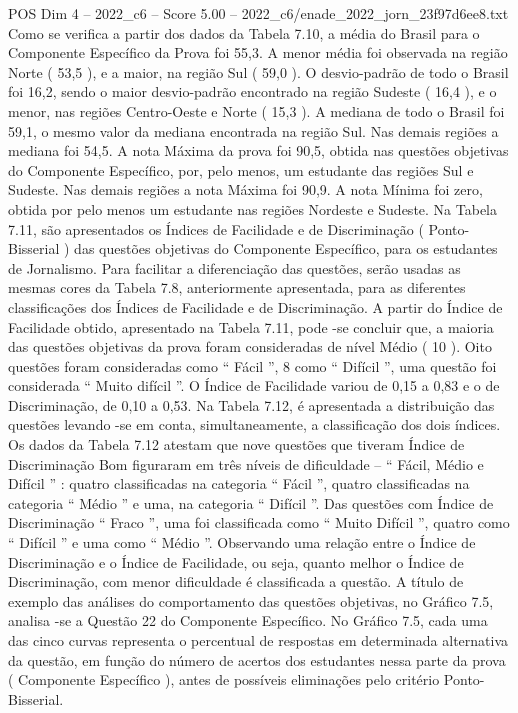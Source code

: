 \begin{textsample}{POS Dim 4 – 2022\_c6 – Score 5.00 – 2022\_c6/enade\_2022\_jorn\_23f97d6ee8.txt}
Como se verifica a partir dos dados da Tabela 7.10, a média do Brasil para o Componente Específico da Prova foi 55,3.
A menor média foi observada na região Norte ( 53,5 ), e a maior, na região Sul ( 59,0 ).
O desvio-padrão de todo o Brasil foi 16,2, sendo o maior desvio-padrão encontrado na região Sudeste ( 16,4 ), e o menor, nas regiões Centro-Oeste e Norte ( 15,3 ).
A mediana de todo o Brasil foi 59,1, o mesmo valor da mediana encontrada na região Sul.
Nas demais regiões a mediana foi 54,5.
A nota Máxima da prova foi 90,5, obtida nas questões objetivas do Componente Específico, por, pelo menos, um estudante das regiões Sul e Sudeste.
Nas demais regiões a nota Máxima foi 90,9.
A nota Mínima foi zero, obtida por pelo menos um estudante nas regiões Nordeste e Sudeste.
Na Tabela 7.11, são apresentados os Índices de Facilidade e de Discriminação ( Ponto-Bisserial ) das questões objetivas do Componente Específico, para os estudantes de Jornalismo.
Para facilitar a diferenciação das questões, serão usadas as mesmas cores da Tabela 7.8, anteriormente apresentada, para as diferentes classificações dos Índices de Facilidade e de Discriminação.
A partir do Índice de Facilidade obtido, apresentado na Tabela 7.11, pode -se concluir que, a maioria das questões objetivas da prova foram consideradas de nível Médio ( 10 ).
Oito questões foram consideradas como “ Fácil ”, 8 como “ Difícil ”, uma questão foi considerada “ Muito difícil ”.
O Índice de Facilidade variou de 0,15 a 0,83 e o de Discriminação, de 0,10 a 0,53.
Na Tabela 7.12, é apresentada a distribuição das questões levando -se em conta, simultaneamente, a classificação dos dois índices.
Os dados da Tabela 7.12 atestam que nove questões que tiveram Índice de Discriminação Bom figuraram em três níveis de dificuldade – “ Fácil, Médio e Difícil ” : quatro classificadas na categoria “ Fácil ”, quatro classificadas na categoria “ Médio ” e uma, na categoria “ Difícil ”.
Das questões com Índice de Discriminação “ Fraco ”, uma foi classificada como “ Muito Difícil ”, quatro como “ Difícil ” e uma como “ Médio ”.
Observando uma relação entre o Índice de Discriminação e o Índice de Facilidade, ou seja, quanto melhor o Índice de Discriminação, com menor dificuldade é classificada a questão.
A título de exemplo das análises do comportamento das questões objetivas, no Gráfico 7.5, analisa -se a Questão 22 do Componente Específico.
No Gráfico 7.5, cada uma das cinco curvas representa o percentual de respostas em determinada alternativa da questão, em função do número de acertos dos estudantes nessa parte da prova ( Componente Específico ), antes de possíveis eliminações pelo critério Ponto-Bisserial.

\end{textsample}

